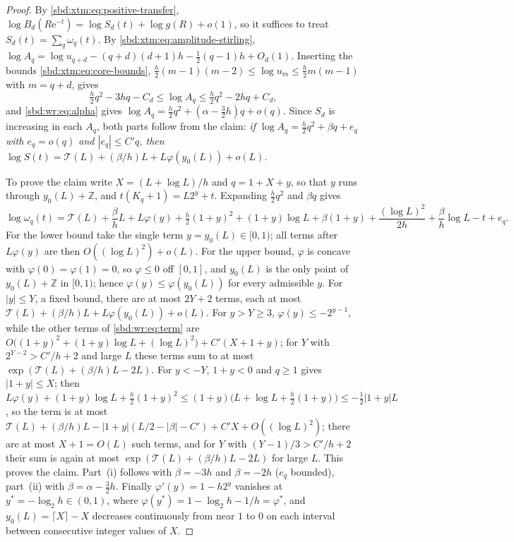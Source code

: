 \documentclass[11pt,a4paper]{article}
\theoremstyle{definition}
\newcommand{\e}{\mathrm e}
\begin{document}
\begin{proof}
By \eqref{sbd:xtm:eq:positive-transfer},
$\log B_d(R\e^{-t})=\log S_d(t)+\log g(R)+o(1)$, so it suffices to treat
$S_d(t)=\sum_q\omega_q(t)$. By \eqref{sbd:xtm:eq:amplitude-stirling},
$\log A_q=\log u_{q+d}-(q+d)(d+1)h-\tfrac12(q-1)h+O_d(1)$. Inserting the
bounds \eqref{sbd:xtm:eq:core-bounds}, $\tfrac h2(m-1)(m-2)\le\log u_m\le
\tfrac h2m(m-1)$ with $m=q+d$, gives
\begin{equation}\label{sbd:wr:eq:A-envelope}
 \tfrac h2q^2-3hq-C_d\le\log A_q\le\tfrac h2q^2-2hq+C_d,
\end{equation}
and \eqref{sbd:wr:eq:alpha} gives
$\log A_q=\tfrac h2q^2+(\alpha-\tfrac32h)q+o(q)$. Since $S_d$ is increasing
in each $A_q$, both parts follow from the claim: \emph{if
$\log A_q=\tfrac h2q^2+\beta q+e_q$ with $e_q=o(q)$ and $|e_q|\le C'q$, then
$\log S(t)=\mathcal T(L)+(\beta/h)L+L\varphi(y_0(L))+o(L)$.}

To prove the claim write $X=(L+\log L)/h$ and $q=1+X+y$, so that $y$ runs
through $y_0(L)+\mathbb Z$, and $t(K_q+1)=L2^y+t$. Expanding $\tfrac h2q^2$
and $\beta q$ gives
\begin{equation}\label{sbd:wr:eq:term}
 \log\omega_q(t)=\mathcal T(L)+\frac\beta hL+L\varphi(y)
 +\tfrac h2(1+y)^2+(1+y)\log L+\beta(1+y)+\frac{(\log L)^2}{2h}
 +\frac\beta h\log L-t+e_q.
\end{equation}
For the lower bound take the single term $y=y_0(L)\in[0,1)$; all terms
after $L\varphi(y)$ are then $O((\log L)^2)+o(L)$. For the upper bound,
$\varphi$ is concave with $\varphi(0)=\varphi(1)=0$, so $\varphi\le0$ off
$[0,1]$, and $y_0(L)$ is the only point of $y_0(L)+\mathbb Z$ in $[0,1)$;
hence $\varphi(y)\le\varphi(y_0(L))$ for every admissible $y$. For $|y|\le Y$,
a fixed bound, there are at most $2Y+2$ terms, each at most
$\mathcal T(L)+(\beta/h)L+L\varphi(y_0(L))+o(L)$. For $y>Y\ge3$,
$\varphi(y)\le-2^{y-1}$, while the other terms of \eqref{sbd:wr:eq:term}
are $O\bigl((1+y)^2+(1+y)\log L+(\log L)^2\bigr)+C'(X+1+y)$; for $Y$ with
$2^{Y-2}>C'/h+2$ and large $L$ these terms sum to at most
$\exp(\mathcal T(L)+(\beta/h)L-2L)$. For $y<-Y$, $1+y<0$ and $q\ge1$ gives
$|1+y|\le X$; then
$L\varphi(y)+(1+y)\log L+\tfrac h2(1+y)^2
\le(1+y)\bigl(L+\log L+\tfrac h2(1+y)\bigr)\le-\tfrac12|1+y|L$, so the term is
at most $\mathcal T(L)+(\beta/h)L-|1+y|(L/2-|\beta|-C')+C'X+O((\log L)^2)$;
there are at most $X+1=O(L)$ such terms, and for $Y$ with
$(Y-1)/3>C'/h+2$ their sum is again at most
$\exp(\mathcal T(L)+(\beta/h)L-2L)$ for large $L$. This proves the claim.
Part~(i) follows with $\beta=-3h$ and $\beta=-2h$ ($e_q$ bounded), part~(ii)
with $\beta=\alpha-\tfrac32h$. Finally $\varphi'(y)=1-h2^y$ vanishes at
$y^*=-\log_2h\in(0,1)$, where $\varphi(y^*)=1-\log_2h-1/h=\varphi^*$, and
$y_0(L)=\lceil X\rceil-X$ decreases continuously from near $1$ to $0$ on
each interval between consecutive integer values of $X$.
\end{proof}
\end{document}
